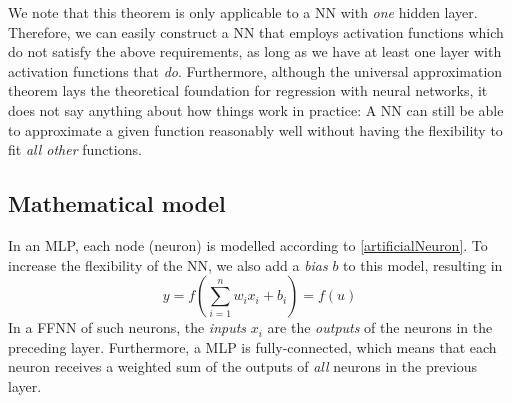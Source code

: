 \documentclass[twoside,english]{uiofysmaster}
\begin{document}
We note that this theorem is only applicable to a NN with \textit{one} hidden layer. 
Therefore, we can easily construct a NN 
that employs activation functions which do not satisfy the above requirements, as long as we have at least one layer
with activation functions that \textit{do}. Furthermore, although the universal approximation theorem
lays the theoretical foundation for regression with neural networks, it does not say anything about how things work in practice: 
A NN can still be able to approximate a given function reasonably well without having the flexibility to fit \textit{all other}
functions. 

\subsection{Mathematical model} \label{sec:MLPmodel}
In an MLP, each node (neuron) is modelled according to \eqref{artificialNeuron}. To increase the flexibility of the NN,
we also add a \textit{bias} $b$ to this model, resulting in 
\begin{equation}
 y = f\left(\sum_{i=1}^n w_ix_i + b_i\right) = f(u)
 \label{artificialNeuron2}
\end{equation}
In a FFNN of such neurons, the \textit{inputs} $x_i$
are the \textit{outputs} of the neurons in the preceding layer. Furthermore, a MLP is fully-connected, 
which means that each neuron receives a weighted sum of the outputs of \textit{all} neurons in the previous layer. 
\end{document}
